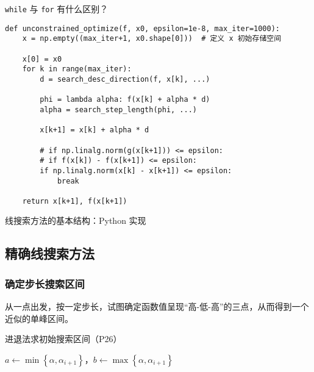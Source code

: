 \documentclass[cn]{elegantpaper}
\begin{document}
\begin{remark}
    \texttt{while} 与 \texttt{for} 有什么区别？
\end{remark}

\begin{listing}[H]
    \begin{verbatim}
def unconstrained_optimize(f, x0, epsilon=1e-8, max_iter=1000):
    x = np.empty((max_iter+1, x0.shape[0]))  # 定义 x 初始存储空间

    x[0] = x0
    for k in range(max_iter):
        d = search_desc_direction(f, x[k], ...)

        phi = lambda alpha: f(x[k] + alpha * d)
        alpha = search_step_length(phi, ...)

        x[k+1] = x[k] + alpha * d

        # if np.linalg.norm(g(x[k+1])) <= epsilon:
        # if f(x[k]) - f(x[k+1]) <= epsilon:
        if np.linalg.norm(x[k] - x[k+1]) <= epsilon:
            break

    return x[k+1], f(x[k+1])
    \end{verbatim}
    \caption{线搜索方法的基本结构：Python 实现}
\end{listing}

\subsection{精确线搜索方法}



\subsubsection{确定步长搜索区间}

从一点出发，按一定步长，试图确定函数值呈现“高-低-高”的三点，从而得到一个近似的单峰区间。

\begin{algorithm}[H]
    \caption{进退法求初始搜索区间（P26）}
    $a\leftarrow\min\left\{\alpha,\alpha_{i+1}\right\}$，$b\leftarrow\max\left\{\alpha,\alpha_{i+1}\right\}$\;
\end{algorithm}
\end{document}
